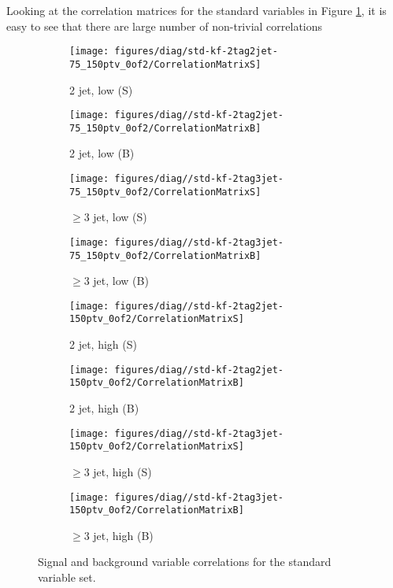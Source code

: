 Looking at the correlation matrices for the standard variables in Figure \ref{fig:std-kf-Correlations}, it is easy to see that there are large number of non-trivial correlations
\begin{figure}[!htbp]\captionsetup{justification=centering}
  \centering
\begin{subfigure}[t]{0.220000\textwidth}\centering\texttt{[image: figures/diag/std-kf-2tag2jet-75\_150ptv\_0of2/CorrelationMatrixS]}\caption{2 jet, low \ptv (S)}\end{subfigure}
\begin{subfigure}[t]{0.220000\textwidth}\centering\texttt{[image: figures/diag//std-kf-2tag2jet-75\_150ptv\_0of2/CorrelationMatrixB]}\caption{2 jet, low \ptv (B)}\end{subfigure}
\begin{subfigure}[t]{0.220000\textwidth}\centering\texttt{[image: figures/diag//std-kf-2tag3jet-75\_150ptv\_0of2/CorrelationMatrixS]}\caption{$\ge3$ jet, low \ptv (S)}\end{subfigure}
\begin{subfigure}[t]{0.220000\textwidth}\centering\texttt{[image: figures/diag//std-kf-2tag3jet-75\_150ptv\_0of2/CorrelationMatrixB]}\caption{$\ge3$ jet, low \ptv (B)}\end{subfigure}
\begin{subfigure}[t]{0.220000\textwidth}\centering\texttt{[image: figures/diag//std-kf-2tag2jet-150ptv\_0of2/CorrelationMatrixS]}\caption{2 jet, high \ptv (S)}\end{subfigure}
\begin{subfigure}[t]{0.220000\textwidth}\centering\texttt{[image: figures/diag//std-kf-2tag2jet-150ptv\_0of2/CorrelationMatrixB]}\caption{2 jet, high \ptv (B)}\end{subfigure}
\begin{subfigure}[t]{0.220000\textwidth}\centering\texttt{[image: figures/diag//std-kf-2tag3jet-150ptv\_0of2/CorrelationMatrixS]}\caption{$\ge3$ jet, high \ptv (S)}\end{subfigure}
\begin{subfigure}[t]{0.220000\textwidth}\centering\texttt{[image: figures/diag//std-kf-2tag3jet-150ptv\_0of2/CorrelationMatrixB]}\caption{$\ge3$ jet, high \ptv (B)}\end{subfigure}
  \caption{Signal and background variable correlations for the standard variable set.}
  \label{fig:std-kf-Correlations}
\end{figure}

